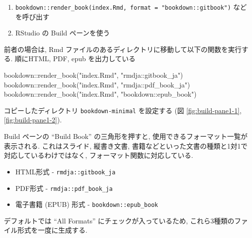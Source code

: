 \documentclass[
  xelatex,ja=standard,jafont=noto]{bxjsbook}
\newenvironment{Shaded}{\begin{snugshade}}{\end{snugshade}}
\newcommand{\FunctionTok}[1]{\textcolor[rgb]{0.00,0.00,0.00}{#1}}
\newcommand{\NormalTok}[1]{#1}
\newcommand{\SpecialCharTok}[1]{\textcolor[rgb]{0.00,0.00,0.00}{#1}}
\newcommand{\StringTok}[1]{\textcolor[rgb]{0.31,0.60,0.02}{#1}}
\providecommand{\tightlist}{%
  \setlength{\itemsep}{0pt}\setlength{\parskip}{0pt}}
\theoremstyle{definition}
\theoremstyle{definition}
\theoremstyle{definition}
\theoremstyle{definition}
\theoremstyle{remark}
\begin{document}
\begin{enumerate}
\def\labelenumi{\arabic{enumi}.}
\tightlist
\item
  \texttt{bookdown::render\_book(\textquotesingle{}index.Rmd\textquotesingle{},\ format\ =\ "bookdown::gitbook")}
  などを呼び出す
\item
  RStudio の Build ペーンを使う
\end{enumerate}

前者の場合は, Rmd
ファイルのあるディレクトリに移動して以下の関数を実行する. 順にHTML, PDF,
epub を出力している

\begin{Shaded}
\begin{Highlighting}[numbers=left,,]
\NormalTok{bookdown}\SpecialCharTok{::}\FunctionTok{render\_book}\NormalTok{(}\StringTok{"index.Rmd"}\NormalTok{, }\StringTok{"rmdja::gitbook\_ja"}\NormalTok{)}
\NormalTok{bookdown}\SpecialCharTok{::}\FunctionTok{render\_book}\NormalTok{(}\StringTok{"index.Rmd"}\NormalTok{, }\StringTok{"rmdja::pdf\_book\_ja"}\NormalTok{)}
\NormalTok{bookdown}\SpecialCharTok{::}\FunctionTok{render\_book}\NormalTok{(}\StringTok{"index.Rmd"}\NormalTok{, }\StringTok{"bookdown::epub\_book"}\NormalTok{)}
\end{Highlighting}
\end{Shaded}

コピーしたディレクトリ \texttt{bookdown-minimal} を設定する (図
\ref{fig:build-pane1-1}, \ref{fig:build-pane1-2}).

Build ペーンの ``Build Book'' の三角形を押すと,
使用できるフォーマット一覧が表示される. これはスライド, 縦書き文書,
書籍などといった文書の種類と1対1で対応しているわけではなく,
フォーマット関数に対応している.

\begin{itemize}
\tightlist
\item
  HTML形式 - \texttt{rmdja::gitbook\_ja}
\item
  PDF形式 - \texttt{rmdja::pdf\_book\_ja}
\item
  電子書籍 (EPUB) 形式 - \texttt{bookdown::epub\_book}
\end{itemize}

デフォルトでは ``All Formats'' にチェックが入っているため,
これら3種類のファイル形式を一度に生成する.
\end{document}
